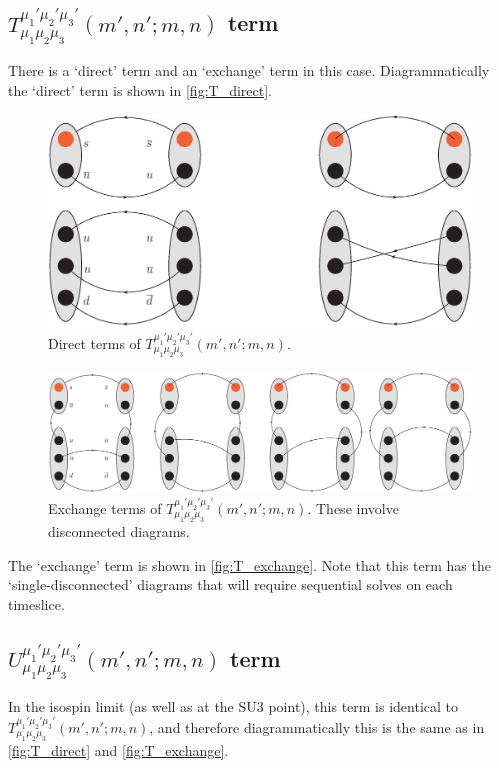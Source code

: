 \documentclass[%
 preprint,
nofootinbib,
 amsmath,amssymb,
 aps,
]{revtex4-2}
\begin{document}
\subsection{$T^{\mu_1'\mu_2'\mu_3'}_{\mu_1\mu_2\mu_3}(m',n';m,n)$ term}
There is a `direct' term and an `exchange' term in this case.  Diagrammatically the `direct' term is shown in \autoref{fig:T_direct}.
\begin{figure}
\includegraphics[width=.6\textwidth]{T_direct.eps}
\caption{Direct terms of $T^{\mu_1'\mu_2'\mu_3'}_{\mu_1\mu_2\mu_3}(m',n';m,n)$. \label{fig:T_direct}}
\end{figure}
\begin{figure}
\includegraphics[width=\textwidth]{T_exchange.eps}
\caption{Exchange terms of $T^{\mu_1'\mu_2'\mu_3'}_{\mu_1\mu_2\mu_3}(m',n';m,n)$.  These involve disconnected diagrams. \label{fig:T_exchange}}
\end{figure}
The `exchange' term is shown in \autoref{fig:T_exchange}.  Note that this term has the `single-disconnected' diagrams that will require sequential solves on each timeslice.

\subsection{$U^{\mu_1'\mu_2'\mu_3'}_{\mu_1\mu_2\mu_3}(m',n';m,n)$ term}
In the isospin limit (as well as at the SU3 point), this term is identical to $T^{\mu_1'\mu_2'\mu_3'}_{\mu_1\mu_2\mu_3}(m',n';m,n)$, and therefore diagrammatically this is the same as in \autoref{fig:T_direct} and \autoref{fig:T_exchange}.
\end{document}
